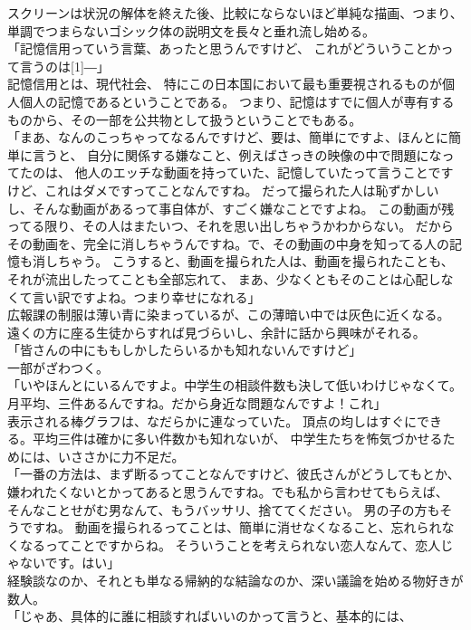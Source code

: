 \documentclass[../NenokuniMain]{subfiles}
\begin{document}
スクリーンは状況の解体を終えた後、比較にならないほど単純な描画、つまり、
単調でつまらないゴシック体の説明文を長々と垂れ流し始める。\\
「記憶信用っていう言葉、あったと思うんですけど、
これがどういうことかって言うのは\scalebox{2}[1]{―}」\\
記憶信用とは、現代社会、
特にこの日本国において最も重要視されるものが個人個人の記憶であるということである。
つまり、記憶はすでに個人が専有するものから、その一部を公共物として扱うということでもある。\\
「まあ、なんのこっちゃってなるんですけど、要は、簡単にですよ、ほんとに簡単に言うと、
自分に関係する嫌なこと、例えばさっきの映像の中で問題になってたのは、
他人のエッチな動画を持っていた、記憶していたって言うことですけど、これはダメですってことなんですね。
だって撮られた人は恥ずかしいし、そんな動画があるって事自体が、すごく嫌なことですよね。
この動画が残ってる限り、その人はまたいつ、それを思い出しちゃうかわからない。
だからその動画を、完全に消しちゃうんですね。で、その動画の中身を知ってる人の記憶も消しちゃう。
こうすると、動画を撮られた人は、動画を撮られたことも、それが流出したってことも全部忘れて、
まあ、少なくともそのことは心配しなくて言い訳ですよね。つまり幸せになれる」\\
広報課の制服は薄い青に染まっているが、この薄暗い中では灰色に近くなる。
遠くの方に座る生徒からすれば見づらいし、余計に話から興味がそれる。\\
「皆さんの中にももしかしたらいるかも知れないんですけど」\\
一部がざわつく。\\
「いやほんとにいるんですよ。中学生の相談件数も決して低いわけじゃなくて。
月平均、三件あるんですね。だから身近な問題なんですよ！これ」\\
表示される棒グラフは、なだらかに連なっていた。
頂点の均しはすぐにできる。平均三件は確かに多い件数かも知れないが、
中学生たちを怖気づかせるためには、いささかに力不足だ。\\
「一番の方法は、まず断るってことなんですけど、彼氏さんがどうしてもとか、
嫌われたくないとかってあると思うんですね。でも私から言わせてもらえば、
そんなことせがむ男なんて、もうバッサリ、捨ててください。
男の子の方もそうですね。
動画を撮られるってことは、簡単に消せなくなること、忘れられなくなるってことですからね。
そういうことを考えられない恋人なんて、恋人じゃないです。はい」\\
経験談なのか、それとも単なる帰納的な結論なのか、深い議論を始める物好きが数人。\\
「じゃあ、具体的に誰に相談すればいいのかって言うと、基本的には、
\end{document}

